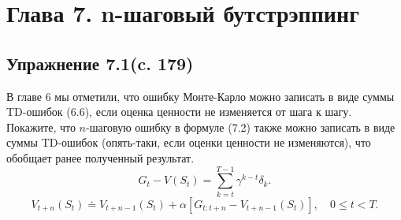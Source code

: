 \section{Глава 7. n-шаговый бутстрэппинг}
\subsection{Упражнение 7.1(c. 179)}
В главе 6 мы отметили, что ошибку Монте-Карло можно записать в виде суммы TD-ошибок (6.6), если оценка ценности не изменяется от шага к шагу. Покажите, что $n$-шаговую ошибку в формуле (7.2) также можно записать в виде суммы TD-ошибок (опять-таки, если оценки ценности не изменяются), что обобщает ранее полученный результат.
\begin{equation}
    G_t - V(S_t) = \sum_{k=t}^{T-1} \gamma^{k-t} \delta_k.
    \tag{6.6}
\end{equation}
\begin{equation}
    V_{t+n}(S_t) \doteq V_{t+n-1}(S_t) + \alpha\left[G_{t:t+n} - V_{t+n-1}(S_t)\right], \quad 0 \le t < T.
    \tag{7.2}
\end{equation}
